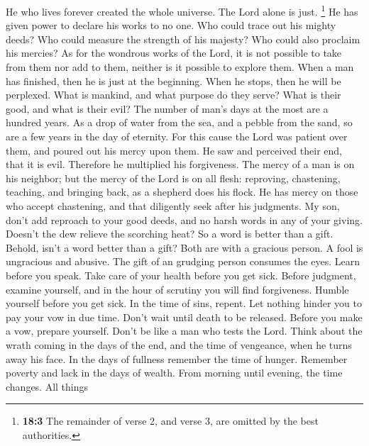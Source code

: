  He who lives forever created the whole universe.
 The Lord alone is just.  \footnote{\textbf{18:3}
  The remainder of verse 2, and verse 3, are omitted by the best
  authorities.}  He has given power to declare his works
to no one. Who could trace out his mighty deeds?  Who
could measure the strength of his majesty? Who could also proclaim his
mercies?  As for the wondrous works of the Lord, it is not
possible to take from them nor add to them, neither is it possible to
explore them.  When a man has finished, then he is just at
the beginning. When he stops, then he will be perplexed. 
What is mankind, and what purpose do they serve? What is their good, and
what is their evil?  The number of man's days at the most
are a hundred years.  As a drop of water from the sea,
and a pebble from the sand, so are a few years in the day of eternity.
 For this cause the Lord was patient over them, and
poured out his mercy upon them.  He saw and perceived
their end, that it is evil. Therefore he multiplied his forgiveness.
 The mercy of a man is on his neighbor; but the mercy of
the Lord is on all flesh: reproving, chastening, teaching, and bringing
back, as a shepherd does his flock.  He has mercy on
those who accept chastening, and that diligently seek after his
judgments.  My son, don't add reproach to your good
deeds, and no harsh words in any of your giving.  Doesn't
the dew relieve the scorching heat? So a word is better than a gift.
 Behold, isn't a word better than a gift? Both are with a
gracious person.  A fool is ungracious and abusive. The
gift of an grudging person consumes the eyes.  Learn
before you speak. Take care of your health before you get sick.
 Before judgment, examine yourself, and in the hour of
scrutiny you will find forgiveness.  Humble yourself
before you get sick. In the time of sins, repent.  Let
nothing hinder you to pay your vow in due time. Don't wait until death
to be released.  Before you make a vow, prepare yourself.
Don't be like a man who tests the Lord.  Think about the
wrath coming in the days of the end, and the time of vengeance, when he
turns away his face.  In the days of fullness remember
the time of hunger. Remember poverty and lack in the days of wealth.
 From morning until evening, the time changes. All things
